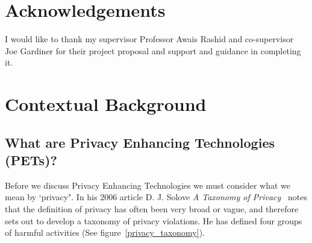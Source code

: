 \documentclass[
    author={Jacob Daniel Halsey},
    supervisor={Prof. Awais Rashid},
    degree={BSc},
    title={Building a Testbed for Evaluating Privacy Enhancing Technologies  (PETs)},
    subtitle={},
    type={software development},
    year={2021}
]{dissertation}
\begin{document}
\chapter*{Acknowledgements}

I would like to thank my supervisor Professor Awais Rashid and co-supervisor Joe Gardiner for their
project proposal and support and guidance in completing it.

\mainmatter


\chapter{Contextual Background}
\label{chap:context}

\section{What are Privacy Enhancing Technologies (PETs)?}

Before we discuss Privacy Enhancing Technologies we must consider what we mean by `privacy". 
In his 2006 article D. J. Solove  \emph{A Taxonomy of Privacy}~\cite{solove_privacy} notes that the
definition of privacy has often been very broad or vague, and therefore sets out to develop
a taxonomy of privacy violations. He has defined four groups of harmful activities (See figure~\ref{privacy_taxonomy}). \\
\end{document}
